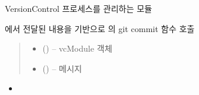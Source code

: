 \documentclass[a4paper,10pt,english]{sphinxmanual}
\begin{document}
\begin{fulllineitems}
\label{\detokenize{_VCModule:vcModule}}
\pysigstartsignatures
{}
\pysigstopsignatures
\sphinxAtStartPar
VersionControl 프로세스를 관리하는 모듈

\begin{fulllineitems}
\label{\detokenize{_VCModule:vcModule.commit}}
\pysigstartsignatures
{}
\pysigstopsignatures
\sphinxAtStartPar
{} 에서 전달된 내용을 기반으로  의 git commit 함수 호출
\begin{quote}\begin{description}
\begin{itemize}
\item {} 
\sphinxAtStartPar
{} ({\hyperref[\detokenize{_VCModule:vcModule}]{}}) – vcModule 객체

\item {} 
\sphinxAtStartPar
{} () –  메시지

\end{itemize}

\end{description}\end{quote}


\nopagebreak

\begin{itemize}
\item {} 
\sphinxAtStartPar
{\hyperref[\detokenize{_VersionController:publishVC.commit}]{}}

\end{itemize}



\end{fulllineitems}



\end{fulllineitems}
\end{document}
